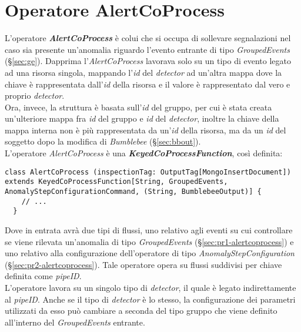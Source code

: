 \section{Operatore AlertCoProcess}
L'operatore \textbf{\textit{AlertCoProcess}} è colui che si occupa di sollevare segnalazioni nel caso sia presente un'anomalia riguardo l'evento entrante di tipo \textit{GroupedEvents} (\S\ref{sec:ge}). Dapprima l'\textit{AlertCoProcess} lavorava solo su un tipo di evento legato ad una risorsa singola, mappando l'\textit{id} del \textit{detector} ad un'altra mappa dove la chiave è rappresentata dall'\textit{id} della risorsa e il valore è rappresentato dal vero e proprio \textit{detector}.\\
Ora, invece, la struttura è basata sull'\textit{id} del gruppo, per cui è stata creata un'ulteriore mappa fra \textit{id} del gruppo e \textit{id} del \textit{detector}, inoltre la chiave della mappa interna non è più rappresentata da un'\textit{id} della risorsa, ma da un \textit{id} del soggetto dopo la modifica di \textit{Bumblebee} (\S\ref{sec:bbout}).\\
L'operatore \textit{AlertCoProcess} è una \textbf{\textit{KeyedCoProcessFunction}}, così definita:
\begin{verbatim}
class AlertCoProcess (inspectionTag: OutputTag[MongoInsertDocument]) extends KeyedCoProcessFunction[String, GroupedEvents, AnomalyStepConfigurationCommand, (String, BumblebeeOutput)] {
	// ...
  }
\end{verbatim}
Dove in entrata avrà due tipi di flussi, uno relativo agli eventi su cui controllare se viene rilevata un'anomalia di tipo \textit{GroupedEvents} (\S\ref{sec:pr1-alertcoprocess}) e uno relativo alla configurazione dell'operatore di tipo \textit{AnomalyStepConfiguration} (\S\ref{sec:pr2-alertcoprocess}). Tale operatore opera su flussi suddivisi per chiave definita come \textit{pipeID}.\\
L'operatore lavora su un singolo tipo di \textit{detector}, il quale è legato indirettamente al \textit{pipeID}. Anche se il tipo di \textit{detector} è lo stesso, la configurazione dei parametri utilizzati da esso può cambiare a seconda del tipo gruppo che viene definito all'interno del \textit{GroupedEvents} entrante.


